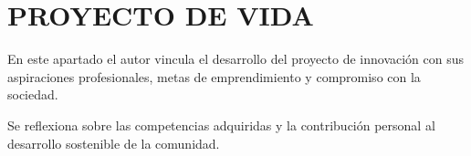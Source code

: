 \chapter{PROYECTO DE VIDA}
\label{chap:proyecto_vida}

En este apartado el autor vincula el desarrollo del proyecto de innovación con sus aspiraciones profesionales, metas de emprendimiento y compromiso con la sociedad.

Se reflexiona sobre las competencias adquiridas y la contribución personal al desarrollo sostenible de la comunidad.
